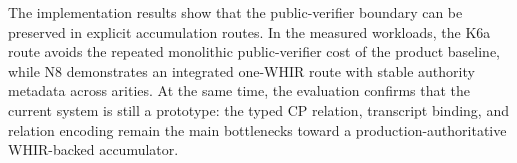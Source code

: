 \documentclass[11pt]{article}
\theoremstyle{definition}
\begin{document}
The implementation results show that the public-verifier boundary can be
preserved in explicit accumulation routes. In the measured workloads, the K6a
route avoids the repeated monolithic public-verifier cost of the product
baseline, while N8 demonstrates an integrated one-WHIR route with stable
authority metadata across arities. At the same time, the evaluation confirms
that the current system is still a prototype: the typed CP relation, transcript
binding, and relation encoding remain the main bottlenecks toward a
production-authoritative WHIR-backed accumulator.




\end{document}
